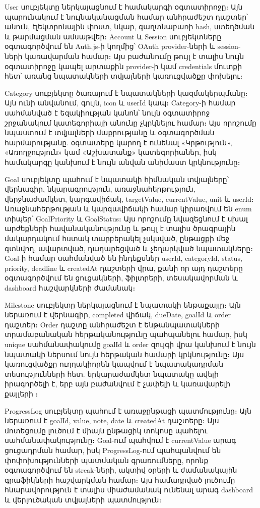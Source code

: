 User սուբյեկտը ներկայացնում է համակարգի օգտատիրոջը։ Այն պարունակում է նույնականացման համար անհրաժեշտ դաշտեր՝ անուն, էլեկտրոնային փոստ, նկար, գաղտնաբառի hash, ստեղծման և թարմացման ամսաթվեր։ Account և Session սուբյեկտները օգտագործվում են Auth.js-ի կողմից՝ OAuth provider-ների և session-ների կառավարման համար։ Այս բաժանումը թույլ է տալիս նույն օգտատիրոջը կապել արտաքին provider-ի կամ credentials մուտքի հետ՝ առանց նպատակների տվյալների կառուցվածքը փոխելու։

Category սուբյեկտը ծառայում է նպատակների կազմակերպմանը։ Այն ունի անվանում, գույն, icon և userId կապ։ Category-ի համար սահմանված է եզակիության կանոն՝ նույն օգտատիրոջ շրջանակում կատեգորիայի անունը չկրկնելու համար։ Այս որոշումը նպաստում է տվյալների մաքրությանը և օգտագործման հարմարությանը. օգտատերը կարող է ունենալ «Կրթություն», «Առողջություն» կամ «Աշխատանք» կատեգորիաներ, իսկ համակարգը կանխում է նույն անվան անիմաստ կրկնությունը։

Goal սուբյեկտը պահում է նպատակի հիմնական տվյալները՝ վերնագիր, նկարագրություն, առաջնահերթություն, վերջնաժամկետ, կարգավիճակ, targetValue, currentValue, unit և userId։ Առաջնահերթության և կարգավիճակի համար կիրառվում են enum տիպեր՝ GoalPriority և GoalStatus։ Այս որոշումը նվազեցնում է սխալ արժեքների հավանականությունը և թույլ է տալիս ծրագրային մակարդակում հստակ տարբերակել չսկսված, ընթացքի մեջ գտնվող, ավարտված, դադարեցված և չեղարկված նպատակները։ Goal-ի համար սահմանված են ինդեքսներ userId, categoryId, status, priority, deadline և createdAt դաշտերի վրա, քանի որ այդ դաշտերը օգտագործվում են ցուցակների, ֆիլտրերի, տեսակավորման և dashboard հաշվարկների ժամանակ։

Milestone սուբյեկտը ներկայացնում է նպատակի ենթաքայլը։ Այն ներառում է վերնագիր, completed վիճակ, dueDate, goalId և order դաշտեր։ Order դաշտը անհրաժեշտ է ենթանպատակների տրամաբանական հերթականությունը պահպանելու համար, իսկ unique սահմանափակումը goalId և order զույգի վրա կանխում է նույն նպատակի ներսում նույն հերթական համարի կրկնությունը։ Այս կառուցվածքը ուղղակիորեն կապվում է նպատակադրման տեսությունների հետ. երկարաժամկետ նպատակը ավելի իրագործելի է, երբ այն բաժանվում է չափելի և կառավարելի քայլերի \autocite{locke2002building,doerr2018measure}։

ProgressLog սուբյեկտը պահում է առաջընթացի պատմությունը։ Այն ներառում է goalId, value, note, date և createdAt դաշտերը։ Այս մոտեցումը լուծում է միայն ընթացիկ տոկոսը պահելու սահմանափակությունը։ Goal-ում պահվում է currentValue արագ ցուցադրման համար, իսկ ProgressLog-ում պահպանվում են փոփոխությունների պատմական գրառումները, որոնք օգտագործվում են streak-ների, ակտիվ օրերի և ժամանակային գրաֆիկների հաշվարկման համար։ Այս համադրված լուծումը հնարավորություն է տալիս միաժամանակ ունենալ արագ dashboard և վերլուծական տվյալների պատմություն։


